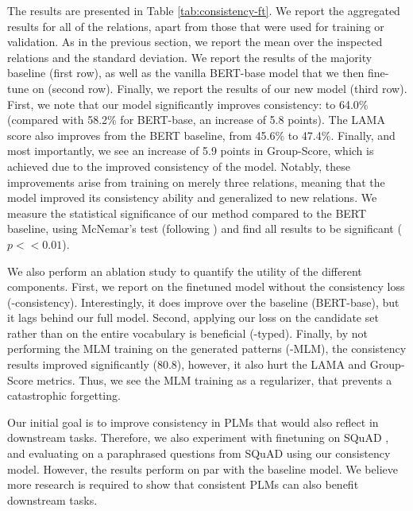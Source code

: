 The results are presented in Table
\ref{tab:consistency-ft}. We report the aggregated results
for all of the relations, apart from those that were used
for training or validation. As in the previous section, we
report the mean over the inspected relations and the
standard deviation.  We report the results of the majority
baseline (first row), as well as the vanilla BERT-base model
that we then fine-tune on (second row). Finally, we report
the results of our new model (third row).  First, we note
that our model significantly improves consistency:
to 64.0\%
(compared with 58.2\% for BERT-base,
an increase
of 5.8 points).  The LAMA score also improves from the BERT
baseline, from 45.6\% to 47.4\%. Finally, and most
importantly, we see an increase of 5.9 points in
Group-Score, which is achieved due to the improved
consistency of the model.  Notably, these improvements
arise from training on merely three relations, meaning that
the model improved its consistency ability and generalized
to new relations.  We measure the statistical
significance of our method compared to the BERT baseline,
using McNemar's test (following
\citet{dror2018hitchhiker,dror2020statistical}) and find all
results to be significant ($p<<0.01$).


We also perform an ablation study to quantify the utility of
the different components. First, we report on the finetuned
model without the consistency loss
(-consistency). Interestingly, it does improve over the
baseline (BERT-base), but it lags behind our full model.
Second, applying our loss on the candidate set rather than
on the entire vocabulary is beneficial (-typed). Finally, by
not performing the MLM training on the generated patterns
(-MLM), the consistency results improved significantly
(80.8), however, it also hurt the LAMA and Group-Score
metrics. Thus, we see the MLM training as a regularizer,
that prevents a catastrophic forgetting.


Our initial goal is to improve consistency in PLMs that would also reflect in downstream tasks. Therefore, we also experiment with finetuning on SQuAD \cite{squad}, and evaluating on a paraphrased questions from SQuAD \cite{squad-paraphrase} using our consistency model. However, the results perform on par with the baseline model.
We believe more research is required to show that consistent PLMs can also benefit downstream tasks.


